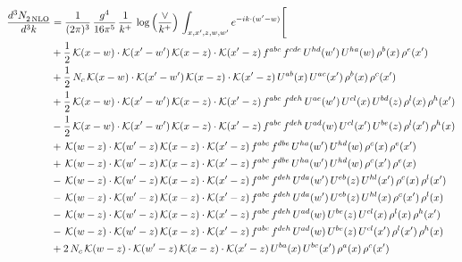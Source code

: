 \documentclass[9pt]{article}
\numberwithin{equation}{section}
\begin{document}
\begin{align}
    \frac{d^{3}N_{2\,\rm NLO}^{\rm}}{d^{3}k}  & = \frac{1}{(2\pi)^{3}}\,\frac{g^{4}}{16\pi^{5}}\,\frac{1}{k^{+}}\,\log{\left(\frac{\vee}{k^{+}}\right)}\, \int_{x,x',z,w,w'}e^{-ik\cdot(w'-w)}\Bigg[\notag\\ & +\frac{1}{2}\,\mathcal{K}(x-w)\cdot\mathcal{K}(x'-w')\,\mathcal{K}(x-z)\cdot\mathcal{K}(x'-z)\,f^{abc}\,f^{cde}\,U^{hd}(w')\,U^{ha}(w)\,\rho^{b}(x)\,\rho^{e}(x')\notag \\ 
&+\frac{1}{2}\,N_{c}\,\mathcal{K}(x-w)\cdot\mathcal{K}(x'-w')\,\mathcal{K}(x-z)\cdot\mathcal{K}(x'-z)\,U^{ab}(x)\,U^{ac}(x')\,\rho^{b}(x)\,\rho^{c}(x')\notag \\ 
&+\frac{1}{2}\,\mathcal{K}(x-w)\cdot\mathcal{K}(x'-w')\,\mathcal{K}(x-z)\cdot\mathcal{K}(x'-z)\,f^{abc}\,f^{deh}\,U^{ae}(w')\,U^{cl}(x)\,U^{bd}(z)\,\rho^{l}(x)\,\rho^{h}(x')\notag \\ 
&-\frac{1}{2}\,\mathcal{K}(x-w)\cdot\mathcal{K}(x'-w')\,\mathcal{K}(x-z)\cdot\mathcal{K}(x'-z)\,f^{abc}\,f^{deh}\,U^{ad}(w)\,U^{cl}(x')\,U^{be}(z)\,\rho^{l}(x')\,\rho^{h}(x)\notag \\ 
&+\,\mathcal{K}(w-z)\cdot\mathcal{K}(w'-z)\,\mathcal{K}(x-z)\cdot\mathcal{K}(x'-z)\,f^{abc}\,f^{dbe}\,U^{ha}(w')\,U^{hd}(w)\,\rho^{c}(x)\,\rho^{e}(x')\notag \\ 
&+\,\mathcal{K}(w-z)\cdot\mathcal{K}(w'-z)\,\mathcal{K}(x-z)\cdot\mathcal{K}(x'-z)\,f^{abc}\,f^{dbe}\,U^{ha}(w')\,U^{hd}(w)\,\rho^{c}(x')\,\rho^{e}(x)\notag \\ 
&-\,\mathcal{K}(w-z)\cdot\mathcal{K}(w'-z)\,\mathcal{K}(x-z)\cdot\mathcal{K}(x'-z)\,f^{abc}\,f^{deh}\,U^{da}(w')\,U^{eb}(z)\,U^{hl}(x')\,\rho^{c}(x)\,\rho^{l}(x')\notag \\ 
&-\,\mathcal{K}(w-z)\cdot\mathcal{K}(w'-z)\,\mathcal{K}(x-z)\cdot\mathcal{K}(x'-z)\,f^{abc}\,f^{deh}\,U^{da}(w')\,U^{eb}(z)\,U^{hl}(x)\,\rho^{c}(x')\,\rho^{l}(x)\notag \\ 
&-\,\mathcal{K}(w-z)\cdot\mathcal{K}(w'-z)\,\mathcal{K}(x-z)\cdot\mathcal{K}(x'-z)\,f^{abc}\,f^{deh}\,U^{ad}(w)\,U^{be}(z)\,U^{cl}(x)\,\rho^{l}(x)\,\rho^{h}(x')\notag \\ 
&-\,\mathcal{K}(w-z)\cdot\mathcal{K}(w'-z)\,\mathcal{K}(x-z)\cdot\mathcal{K}(x'-z)\,f^{abc}\,f^{deh}\,U^{ad}(w)\,U^{be}(z)\,U^{cl}(x')\,\rho^{l}(x')\,\rho^{h}(x)\notag \\ 
&+2\,N_{c}\,\mathcal{K}(w-z)\cdot\mathcal{K}(w'-z)\,\mathcal{K}(x-z)\cdot\mathcal{K}(x'-z)\,U^{ba}(x)\,U^{bc}(x')\,\rho^{a}(x)\,\rho^{c}(x')\notag \\ 

\end{align}
\end{document}
